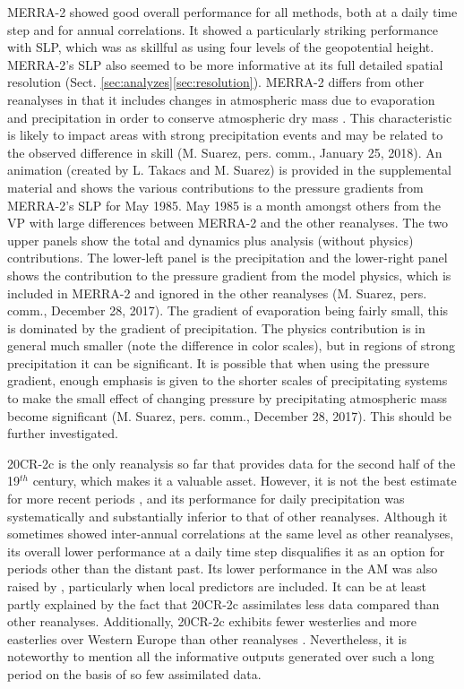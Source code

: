 \documentclass{ametsoc}
\begin{document}
	MERRA-2 showed good overall performance for all methods, both at a daily time step and for annual correlations. It showed a particularly striking performance with SLP, which was as skillful as using four levels of the geopotential height. MERRA-2's SLP also seemed to be more informative at its full detailed spatial resolution (Sect. \ref{sec:analyzes}\ref{sec:resolution}). MERRA-2 differs from other reanalyses in that it includes changes in atmospheric mass due to evaporation and precipitation in order to conserve atmospheric dry mass \cite{Gelaro2017}. This characteristic is likely to impact areas with strong precipitation events and may be related to the observed difference in skill (M. Suarez, pers. comm., January 25, 2018). An animation (created by L. Takacs and M. Suarez) is provided in the supplemental material and shows the various contributions to the pressure gradients from MERRA-2's SLP for May 1985. May 1985 is a month amongst others from the VP with large differences between MERRA-2 and the other reanalyses. The two upper panels show the total and dynamics plus analysis (without physics) contributions. The lower-left panel is the precipitation and the lower-right panel shows the contribution to the pressure gradient from the model physics, which is included in MERRA-2 and ignored in the other reanalyses (M. Suarez, pers. comm., December 28, 2017). The gradient of evaporation being fairly small, this is dominated by the gradient of precipitation. The physics contribution is in general much smaller (note the difference in color scales), but in regions of strong precipitation it can be significant. It is possible that when using the pressure gradient, enough emphasis is given to the shorter scales of precipitating systems to make the small effect of changing pressure by precipitating atmospheric mass become significant (M. Suarez, pers. comm., December 28, 2017). This should be further investigated.
	
	20CR-2c is the only reanalysis so far that provides data for the second half of the 19$^{th}$ century, which makes it a valuable asset. However, it is not the best estimate for more recent periods \citep{Poli2017}, and its performance for daily precipitation was systematically and substantially inferior to that of other reanalyses. Although it sometimes showed inter-annual correlations at the same level as other reanalyses, its overall lower performance at a daily time step disqualifies it as an option for periods other than the distant past. Its lower performance in the AM was also raised by \citet[][]{Dayon2015}, particularly when local predictors are included. It can be at least partly explained by the fact that 20CR-2c assimilates less data compared than other reanalyses. Additionally, 20CR-2c exhibits fewer westerlies and more easterlies over Western Europe than other reanalyses \citep{Rohrer2018}. Nevertheless, it is noteworthy to mention all the informative outputs generated over such a long period on the basis of so few assimilated data.
	
\end{document}

